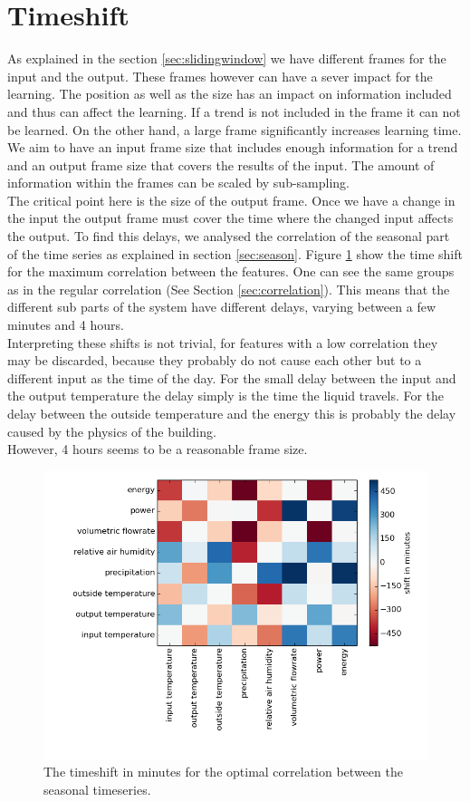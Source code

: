 \documentclass{scrartcl}
\begin{document}
\section{Timeshift}
As explained in the section \ref{sec:slidingwindow} we have different frames for the input and the output. These frames however can have a sever impact for the learning. The position as well as the size has an impact on information included and thus can affect the learning. If a trend is not included in the frame it can not be learned. On the other hand, a large frame significantly increases learning time. We aim to have an input frame size that includes enough information for a trend and an output frame size that covers the results of the input. The amount of information within the frames can be scaled by sub-sampling.\\
The critical point here is the size of the output frame. Once we have a change in the input the output frame must cover the time where the changed input affects the output. To find this delays, we analysed the correlation of the seasonal part of the time series as explained in section \ref{sec:season}. Figure \ref{fig:timeshift} show the time shift for the maximum correlation between the features. One can see the same groups as in the regular correlation (See Section \ref{sec:correlation}). This means that the different sub parts of the system have different delays, varying between a few minutes and 4 hours.\\
Interpreting these shifts is not trivial, for features with a low correlation they may be discarded, because they probably do not cause each other but to a different input as the time of the day. For the small delay between the input and the output temperature the delay simply is the time the liquid travels. For the delay between the outside temperature and the energy this is probably the delay caused by the physics of the building.\\
However, 4 hours seems to be a reasonable frame size.


\begin{figure}[H]
  \centering
  \includegraphics[width=0.5\linewidth]{img/timeshift.png}
  \caption{The timeshift in minutes for the optimal correlation between the seasonal timeseries.}
  \label{fig:timeshift}
\end{figure}
\end{document}
